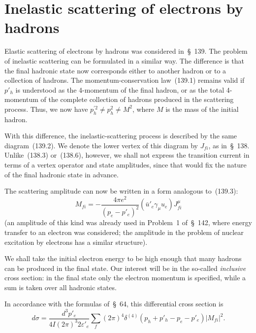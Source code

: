 \section{Inelastic scattering of electrons by hadrons}

Elastic scattering of electrons by hadrons was considered in~\S~139. The problem of inelastic scattering can be formulated in a similar way. The difference is that the final hadronic state now corresponds either to another hadron or to a collection of hadrons. The momentum-conservation law~(139.1) remains valid if $p'_h$ is understood as the 4-momentum of the final hadron, or as the total 4-momentum of the complete collection of hadrons produced in the scattering process. Thus, we now have $p_h^{\prime 2}\ne p_h^2\ne M^2$, where $M$ is the mass of the initial hadron.

With this difference, the inelastic-scattering process is described by the same diagram~(139.2). We denote the lower vertex of this diagram by $J_{fi}$, as in~\S~138. Unlike~(138.3) or~(138.6), however, we shall not express the transition current in terms of a vertex operator and state amplitudes, since that would fix the nature of the final hadronic state in advance.

The scattering amplitude can now be written in a form analogous to~(139.3):
\begin{equation}
M_{fi}=-\frac{4\pi e^2}{(p_e-p'_e)^2}(\bar u'_e\gamma_\mu u_e)J_{fi}^\mu
\tag{143.1}
\end{equation}
(an amplitude of this kind was already used in Problem~1 of~\S~142, where energy transfer to an electron was considered; the amplitude in the problem of nuclear excitation by electrons has a similar structure).

We shall take the initial electron energy to be high enough that many hadrons can be produced in the final state. Our interest will be in the so-called \emph{inclusive} cross section: in the final state only the electron momentum is specified, while a sum is taken over all hadronic states.

In accordance with the formulas of~\S~64, this differential cross section is
\begin{equation}
d\sigma=\frac{d^3p'_e}{4I(2\pi)^3 2\varepsilon'_e}
\sum_f(2\pi)^4\delta^{(4)}(p_h+p'_h-p_e-p'_e)|M_{fi}|^2.
\tag{143.2}
\end{equation}

